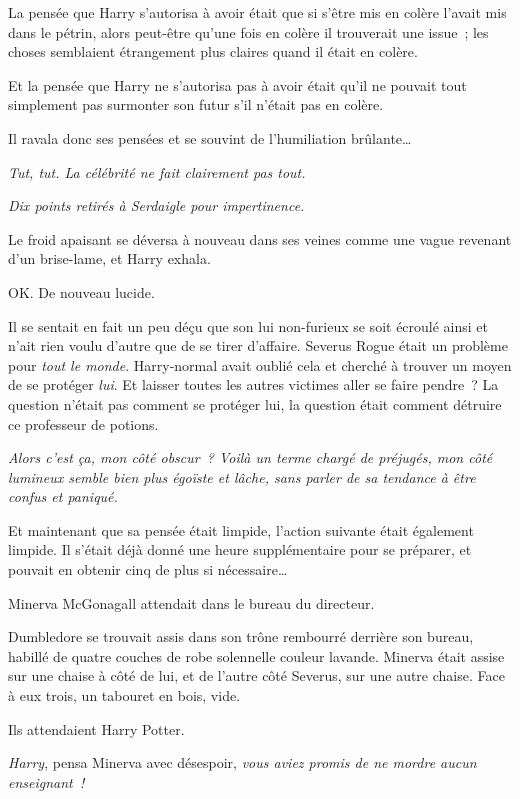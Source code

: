 La pensée que Harry s'autorisa à avoir était que si s'être mis en colère l'avait mis dans le pétrin, alors peut-être qu'une fois en colère il trouverait une issue~; les choses semblaient étrangement plus claires quand il était en colère.

Et la pensée que Harry ne s'autorisa pas à avoir était qu'il ne pouvait tout simplement pas surmonter son futur s'il n'était pas en colère.

Il ravala donc ses pensées et se souvint de l'humiliation brûlante…

\emph{Tut, tut.
La célébrité ne fait clairement pas tout.}

\emph{Dix points retirés à Serdaigle pour impertinence.}

Le froid apaisant se déversa à nouveau dans ses veines comme une vague revenant d'un brise-lame, et Harry exhala.

OK. De nouveau lucide.

Il se sentait en fait un peu déçu que son lui non-furieux se soit écroulé ainsi et n'ait rien voulu d'autre que de se tirer d'affaire.
Severus Rogue était un problème pour \emph{tout le monde}.
Harry-normal avait oublié cela et cherché à trouver un moyen de se protéger \emph{lui}.
Et laisser toutes les autres victimes aller se faire pendre~?
La question n'était pas comment se protéger lui, la question était comment détruire ce professeur de potions.

\emph{Alors c'est ça, mon côté obscur~?
Voilà un terme chargé de préjugés, mon côté lumineux semble bien plus égoïste et lâche, sans parler de sa tendance à être confus et paniqué.}

Et maintenant que sa pensée était limpide, l'action suivante était également limpide.
Il s'était déjà donné une heure supplémentaire pour se préparer, et pouvait en obtenir cinq de plus si nécessaire…

\later

Minerva McGonagall attendait dans le bureau du directeur.

Dumbledore se trouvait assis dans son trône rembourré derrière son bureau, habillé de quatre couches de robe solennelle couleur lavande.
Minerva était assise sur une chaise à côté de lui, et de l'autre côté Severus, sur une autre chaise.
Face à eux trois, un tabouret en bois, vide.

Ils attendaient Harry Potter.

\emph{Harry}, pensa Minerva avec désespoir, \emph{vous aviez promis de ne mordre aucun enseignant~!}

